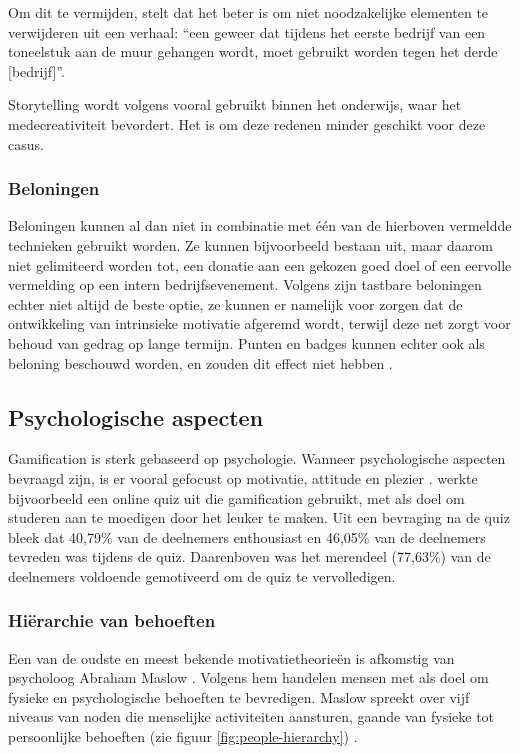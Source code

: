 Om dit te vermijden, stelt \textcite{Duster1990} dat het beter is om niet noodzakelijke elementen te verwijderen uit een verhaal: ``een geweer dat tijdens het eerste bedrijf van een toneelstuk aan de muur gehangen wordt, moet gebruikt worden tegen het derde [bedrijf]''.

Storytelling wordt volgens \textcite{Schmoelz2018} vooral gebruikt binnen het onderwijs, waar het medecreativiteit bevordert. Het is om deze redenen minder geschikt voor deze casus.


\subsubsection{Beloningen}
Beloningen kunnen al dan niet in combinatie met één van de hierboven vermeldde technieken gebruikt worden. Ze kunnen bijvoorbeeld bestaan uit, maar daarom niet gelimiteerd worden tot, een donatie aan een gekozen goed doel of een eervolle vermelding op een intern bedrijfsevenement.
Volgens \textcite{Lewis2016} zijn tastbare beloningen echter niet altijd de beste optie, ze kunnen er namelijk voor zorgen dat de ontwikkeling van intrinsieke motivatie afgeremd wordt, terwijl deze net zorgt voor behoud van gedrag op lange termijn. Punten en badges kunnen echter ook als beloning beschouwd worden, en zouden dit effect niet hebben \autocite{Lewis2016}.

\subsection{Psychologische aspecten}
Gamification is sterk gebaseerd op psychologie. Wanneer psychologische aspecten bevraagd zijn, is er vooral gefocust op motivatie, attitude en plezier \autocite{Hamari2014}. \textcite{Cheong2013} werkte bijvoorbeeld een online quiz uit die gamification gebruikt, met als doel om studeren aan te moedigen door het leuker te maken. Uit een bevraging  na de quiz bleek dat 40,79\% van de deelnemers enthousiast en 46,05\% van de deelnemers tevreden was tijdens de quiz. Daarenboven was het merendeel (77,63\%) van de deelnemers voldoende gemotiveerd om de quiz te vervolledigen.

\subsubsection{Hiërarchie van behoeften}
Een van de oudste en meest bekende motivatietheorieën is afkomstig van psycholoog Abraham Maslow \autocite{Richter2014}. Volgens hem handelen mensen met als doel om fysieke en psychologische behoeften te bevredigen. Maslow spreekt over vijf niveaus van noden die menselijke activiteiten aansturen, gaande van fysieke tot persoonlijke behoeften (zie figuur \ref{fig:people-hierarchy}) \autocite{Lilienfeld2014}.

